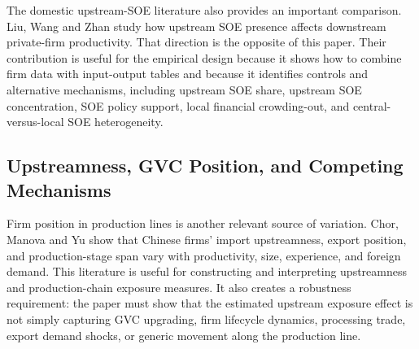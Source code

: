 The domestic upstream-SOE literature also provides an important comparison. Liu, Wang and Zhan study how upstream SOE presence affects downstream private-firm productivity. That direction is the opposite of this paper. Their contribution is useful for the empirical design because it shows how to combine firm data with input-output tables and because it identifies controls and alternative mechanisms, including upstream SOE share, upstream SOE concentration, SOE policy support, local financial crowding-out, and central-versus-local SOE heterogeneity.

\subsection{Upstreamness, GVC Position, and Competing Mechanisms}

Firm position in production lines is another relevant source of variation. Chor, Manova and Yu show that Chinese firms' import upstreamness, export position, and production-stage span vary with productivity, size, experience, and foreign demand. This literature is useful for constructing and interpreting upstreamness and production-chain exposure measures. It also creates a robustness requirement: the paper must show that the estimated upstream exposure effect is not simply capturing GVC upgrading, firm lifecycle dynamics, processing trade, export demand shocks, or generic movement along the production line.

